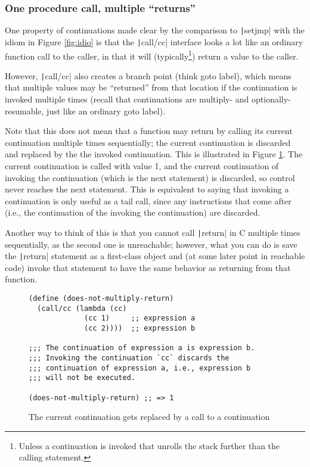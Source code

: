 \documentclass[]{article}
\begin{document}
\subsubsection{One procedure call, multiple ``returns''}
\label{sec:mult}

One property of continuations made clear by the comparison to \texttt|setjmp| with the idiom in Figure \ref{fig:idio} is that the \texttt|call/cc| interface looks a lot like an ordinary function call to the caller, in that it will (typically\footnote{Unless a continuation is invoked that unrolls the stack further than the calling statement.}) return a value to the caller.

However, \texttt|call/cc| also creates a branch point (think goto label), which means that multiple values may be ``returned'' from that location if the continuation is invoked multiple times (recall that continuations are multiply- and optionally-resumable, just like an ordinary goto label).

Note that this does not mean that a function may return by calling its current continuation multiple times sequentially; the current continuation is discarded and replaced by the the invoked continuation. This is illustrated in Figure \ref{fig:ccre}. The current continuation is called with value 1, and the current continuation of invoking the continuation (which is the next statement) is discarded, so control never reaches the next statement. This is equivalent to saying that invoking a continuation is only useful as a tail call, since any instructions that come after (i.e., the continuation of the invoking the continuation) are discarded.

Another way to think of this is that you cannot call \texttt|return| in C multiple times sequentially, as the second one is unreachable; however, what you can do is save the \texttt|return| statement as a first-class object and (at some later point in reachable code) invoke that statement to have the same behavior as returning from that function.

\begin{figure}
  \centering
\begin{verbatim}
(define (does-not-multiply-return)
  (call/cc (lambda (cc)
             (cc 1)     ;; expression a
             (cc 2))))  ;; expression b

;;; The continuation of expression a is expression b.
;;; Invoking the continuation `cc` discards the
;;; continuation of expression a, i.e., expression b
;;; will not be executed.

(does-not-multiply-return) ;; => 1
\end{verbatim}
  \caption{The current continuation gets replaced by a call to a continuation}
  \label{fig:ccre}
\end{figure}
\end{document}

